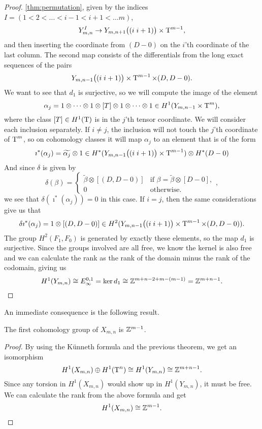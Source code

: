 \begin{proof}
  \ref{thm:permutation}, given by the indices $I = (1 < 2 < \dots <
  i-1 < i+1 < \dots m)$,
  \[ Y_{m,n}^I \to Y_{m,n+1}\big((i \; i+1)\big) \times \operatorname{T}^{m-1}, \]
  and then inserting the coordinate from $(D-0)$ on the $i$'th
  coordinate of the last column.
  The second map consists of the differentials from the long exact
  sequences of the pairs
  \[ Y_{m,n-1}\big((i\; i+1)\big) \times \operatorname{T}^{m-1}\times (D,D-0). \]
  We want to see that $d_1$ is surjective, so we will compute the
  image of the element 
  \[ \alpha_j = 1\otimes\dots\otimes 1\otimes [T] \otimes 1 \otimes
  \dots
  \otimes 1 \in H^1(Y_{m,n-1}\times \operatorname{T}^{m}),\] 
  where the class $[T]\in H^1(\operatorname{T})$ is in the $j$'th tensor coordinate.
  We will consider each inclusion separately. If $i \neq j$, the
  inclusion will not touch the $j$'th coordinate of $\operatorname{T}^m$, so on
  cohomology classes it will map $\alpha_j$ to an element that is of
  the form
  \[ \imath^*(\alpha_j) = \widetilde{\alpha_j}\otimes 1 \in
  H^*(Y_{m,n-1}\big((i\; i+1) \big) \times \operatorname{T}^{m-1}) \otimes
  H^*(D-0) \]
  And since $\delta$ is given by
  \[ \delta(\beta) =
  \begin{cases}
    \widetilde{\beta}\otimes [(D,D-0)] & \text{if } \beta =
    \widetilde{\beta}\otimes [D-0], \\
    0 & \text{otherwise}.
  \end{cases}, \]
  we see that $\delta(\imath^*(\alpha_j)) = 0$ in this case. If $i =
  j$, then the same considerations give us that
  \[ \delta\imath^*(\alpha_j) = 1 \otimes [(D,D-0)] \in
  H^2(Y_{m,n-1}\big((i\; i+1) \big) \times \operatorname{T}^{m-1}\times (D,D-0)). \]
  The group $H^2(F_1,F_0)$ is generated by exactly these elements, so
  the map $d_1$ is surjective. Since the groups involved are all free,
  we know the kernel is also free and we can calculate the rank as the
  rank of the domain minus the rank of the codomain, giving us
  \[ H^1(Y_{m,n}) \cong E_{\infty}^{0,1} = \ker d_1 \cong
  \mathbb{Z}^{m+n-2+m-(m-1)} = \mathbb{Z}^{m+n-1}. \]
\end{proof}

An immediate consequence is the following result.

\begin{corollary}
  \label{cor:1-kohom}
  The first cohomology group of $X_{m,n}$ is $\mathbb{Z}^{m-1}$.
\end{corollary}
\begin{proof}
  By using the K\"unneth formula and the previous theorem, we get an
  isomorphism
  \[ H^1(X_{m,n}) \oplus H^1(\operatorname{T}^n) \cong  H^1(Y_{m,n}) \cong
  \mathbb{Z}^{m+n-1}. \]
  Since any torsion in $H^1(X_{m,n})$ would show up in $H^1(Y_{m,n})$,
  it must be free. We can calculate the rank from the above formula
  and get
  \[ H^1(X_{m,n}) \cong \mathbb{Z}^{m-1}. \]
\end{proof}

